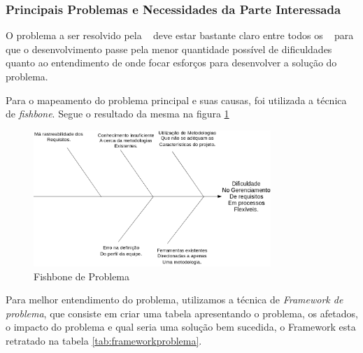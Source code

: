 \subsubsection{Principais Problemas e Necessidades da Parte Interessada}

O problema a ser resolvido pela \nomeferramenta~ deve estar bastante claro entre todos os \stakeholder~ para que o desenvolvimento passe pela menor quantidade possível de dificuldades quanto ao entendimento de onde focar esforços para desenvolver a solução do problema.

Para o mapeamento do problema principal e suas causas, foi utilizada a técnica de \textit{fishbone}. Segue o resultado da mesma na figura \ref{img:fishbone}

\begin{figure}[H]
	\centering
	\includegraphics[width=0.8\textwidth]{conteudo/fishbone}
	\caption{Fishbone de Problema}
	\label{img:fishbone}
\end{figure}

Para melhor entendimento do problema, utilizamos a técnica de \textit{Framework de problema}, que consiste em criar uma tabela apresentando o problema, os afetados, o impacto do problema e qual seria uma solução bem sucedida, o Framework esta retratado na tabela \ref{tab:frameworkproblema}.

